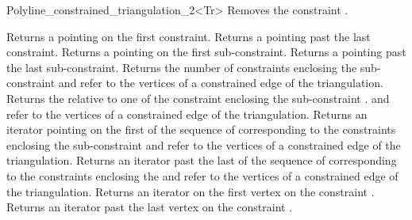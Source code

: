 \begin{ccRefClass}{Polyline_constrained_triangulation_2<Tr>}
{Removes the constraint .}


{Returns a  pointing on the first
constraint.}
\ccGlue
{}
{Returns a  pointing past the last
constraint.}
\ccGlue
{}
{Returns a  pointing on the first
sub-constraint.}
\ccGlue
{}
{Returns a  pointing past the last
sub-constraint.}
\ccGlue
{}
{Returns the number of constraints enclosing the sub-constraint
\ccPrecond {} and  refer to  the vertices
of a constrained edge of the triangulation.}
\ccGlue
{}
{Returns the   relative to  one of the constraint 
enclosing  the sub-constraint  .
\ccPrecond {} and  refer to  the vertices
of a constrained edge of the triangulation.}
\ccGlue
{}
{Returns an iterator pointing on the first 
of the sequence of 
corresponding to the constraints enclosing the sub-constraint
\ccPrecond {} and  refer to  the vertices
of a constrained edge of the triangulation.}
\ccGlue
{}
{Returns an iterator past the last  
of the sequence of 
corresponding to the constraints enclosing the  
\ccPrecond {} and  refer to  the vertices
of a constrained edge of the triangulation.}
\ccGlue
{}
{Returns an iterator on the first vertex on the constraint
.}
\ccGlue
{}
{Returns an iterator past the last vertex on  the constraint
.}




\end{ccRefClass}

